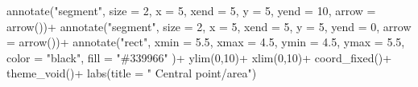 \documentclass[
  letterpaper,
]{book}
\newenvironment{Shaded}{\begin{snugshade}}{\end{snugshade}}
\newcommand{\AttributeTok}[1]{\textcolor[rgb]{0.40,0.45,0.13}{#1}}
\newcommand{\DecValTok}[1]{\textcolor[rgb]{0.68,0.00,0.00}{#1}}
\newcommand{\FloatTok}[1]{\textcolor[rgb]{0.68,0.00,0.00}{#1}}
\newcommand{\FunctionTok}[1]{\textcolor[rgb]{0.28,0.35,0.67}{#1}}
\newcommand{\NormalTok}[1]{\textcolor[rgb]{0.00,0.23,0.31}{#1}}
\newcommand{\SpecialCharTok}[1]{\textcolor[rgb]{0.37,0.37,0.37}{#1}}
\newcommand{\StringTok}[1]{\textcolor[rgb]{0.13,0.47,0.30}{#1}}
\begin{document}
\begin{Shaded}
\begin{Highlighting}[]
  \FunctionTok{annotate}\NormalTok{(}\StringTok{"segment"}\NormalTok{, }\AttributeTok{size =} \DecValTok{2}\NormalTok{, }\AttributeTok{x =} \DecValTok{5}\NormalTok{, }\AttributeTok{xend =} \DecValTok{5}\NormalTok{, }\AttributeTok{y =} \DecValTok{5}\NormalTok{, }\AttributeTok{yend =} \DecValTok{10}\NormalTok{, }\AttributeTok{arrow =} \FunctionTok{arrow}\NormalTok{())}\SpecialCharTok{+}
  \FunctionTok{annotate}\NormalTok{(}\StringTok{"segment"}\NormalTok{, }\AttributeTok{size =} \DecValTok{2}\NormalTok{, }\AttributeTok{x =} \DecValTok{5}\NormalTok{, }\AttributeTok{xend =} \DecValTok{5}\NormalTok{, }\AttributeTok{y =} \DecValTok{5}\NormalTok{, }\AttributeTok{yend =} \DecValTok{0}\NormalTok{, }\AttributeTok{arrow =} \FunctionTok{arrow}\NormalTok{())}\SpecialCharTok{+}
   \FunctionTok{annotate}\NormalTok{(}\StringTok{"rect"}\NormalTok{, }\AttributeTok{xmin =} \FloatTok{5.5}\NormalTok{, }\AttributeTok{xmax =} \FloatTok{4.5}\NormalTok{, }\AttributeTok{ymin =} \FloatTok{4.5}\NormalTok{, }\AttributeTok{ymax =} \FloatTok{5.5}\NormalTok{, }\AttributeTok{color =} \StringTok{"black"}\NormalTok{, }\AttributeTok{fill =} \StringTok{"\#339966"}\NormalTok{ )}\SpecialCharTok{+}
  \FunctionTok{ylim}\NormalTok{(}\DecValTok{0}\NormalTok{,}\DecValTok{10}\NormalTok{)}\SpecialCharTok{+}
  \FunctionTok{xlim}\NormalTok{(}\DecValTok{0}\NormalTok{,}\DecValTok{10}\NormalTok{)}\SpecialCharTok{+}
  \FunctionTok{coord\_fixed}\NormalTok{()}\SpecialCharTok{+}
  \FunctionTok{theme\_void}\NormalTok{()}\SpecialCharTok{+}
  \FunctionTok{labs}\NormalTok{(}\AttributeTok{title =} \StringTok{"    Central point/area"}\NormalTok{)}


\end{Highlighting}
\end{Shaded}
\end{document}
